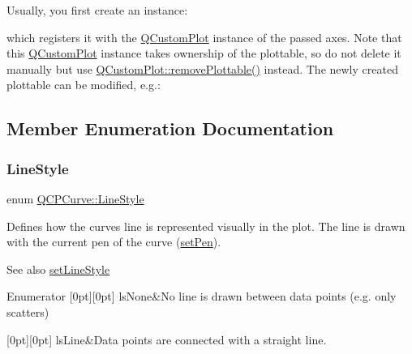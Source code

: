Usually, you first create an instance\+: 
\begin{DoxyCodeInclude}
\end{DoxyCodeInclude}
which registers it with the \hyperlink{class_q_custom_plot}{Q\+Custom\+Plot} instance of the passed axes. Note that this \hyperlink{class_q_custom_plot}{Q\+Custom\+Plot} instance takes ownership of the plottable, so do not delete it manually but use \hyperlink{class_q_custom_plot_af3dafd56884208474f311d6226513ab2}{Q\+Custom\+Plot\+::remove\+Plottable()} instead. The newly created plottable can be modified, e.\+g.\+: 
\begin{DoxyCodeInclude}
\end{DoxyCodeInclude}


\subsection{Member Enumeration Documentation}
\mbox{\label{class_q_c_p_curve_a2710e9f79302152cff794c6e16cc01f1}} 
\subsubsection{\texorpdfstring{Line\+Style}{LineStyle}}
{\footnotesize\ttfamily enum \hyperlink{class_q_c_p_curve_a2710e9f79302152cff794c6e16cc01f1}{Q\+C\+P\+Curve\+::\+Line\+Style}}

Defines how the curve\textquotesingle{}s line is represented visually in the plot. The line is drawn with the current pen of the curve (\hyperlink{class_q_c_p_abstract_plottable_ab74b09ae4c0e7e13142fe4b5bf46cac7}{set\+Pen}). \begin{DoxySeeAlso}{See also}
\hyperlink{class_q_c_p_curve_a4a377ec863ff81a1875c3094a6177c19}{set\+Line\+Style} 
\end{DoxySeeAlso}
\begin{DoxyEnumFields}{Enumerator}
[0pt][0pt]{}\mbox{\label{class_q_c_p_curve_a2710e9f79302152cff794c6e16cc01f1aec1601a191cdf0b4e761c4c66092cc48}} 
ls\+None&No line is drawn between data points (e.\+g. only scatters) \\
\hline

[0pt][0pt]{}\mbox{\label{class_q_c_p_curve_a2710e9f79302152cff794c6e16cc01f1ade5822ce6fbf131d3df131795c2e1003}} 
ls\+Line&Data points are connected with a straight line. \\
\hline

\end{DoxyEnumFields}


